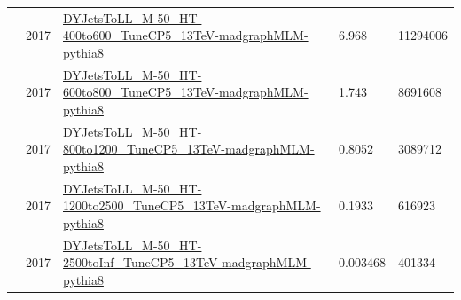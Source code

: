 \begin{table}
{\begin{tabular}{lllll}
              & 2017       & \url{DYJetsToLL_M-50_HT-400to600_TuneCP5_13TeV-madgraphMLM-pythia8}                       & 6.968              & 11294006         \\
              & 2017       & \url{DYJetsToLL_M-50_HT-600to800_TuneCP5_13TeV-madgraphMLM-pythia8}                       & 1.743              & 8691608          \\
              & 2017       & \url{DYJetsToLL_M-50_HT-800to1200_TuneCP5_13TeV-madgraphMLM-pythia8}                      & 0.8052             & 3089712          \\
              & 2017       & \url{DYJetsToLL_M-50_HT-1200to2500_TuneCP5_13TeV-madgraphMLM-pythia8}                     & 0.1933             & 616923           \\
              & 2017       & \url{DYJetsToLL_M-50_HT-2500toInf_TuneCP5_13TeV-madgraphMLM-pythia8}                      & 0.003468           & 401334           \\
      \bottomrule
    \end{tabular}%
  }\label{tab:mc-list-1}
\end{table}

